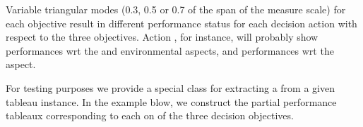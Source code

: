 \documentclass[a4paper,12pt,english]{sphinxhowto}
\begin{document}
\begin{sphinxVerbatim}[commandchars=\\\{\},numbers=left,firstnumber=1,stepnumber=1]
\end{sphinxVerbatim}

Variable triangular modes (0.3, 0.5 or 0.7 of the span of the measure scale) for each objective result in different performance status for each decision action with respect to the three objectives. Action  , for instance, will probably show  performances wrt the   and environmental aspects, and  performances wrt the  aspect.

For testing purposes we provide a special  class for extracting a  from a given tableau instance. In the example blow, we construct the partial performance tableaux corresponding to each on of the three decision objectives.
\end{document}
